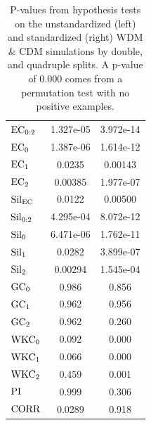 \documentclass[12pt]{article}
\begin{document}
\begin{table}[htp!]
\begin{center}
\begin{tabular}{ l | c |  c }
          $\textup{EC}_{0:2}$ & 1.327e-05 &  3.972e-14 \\
          $\textup{EC}_{0}$ & 1.387e-06 & 1.614e-12 \\
          $\textup{EC}_{1}$ & 0.0235 & 0.00143 \\
          $\textup{EC}_{2}$ & 0.00385 & 1.977e-07 \\
          \midrule
          $\textup{Sil}_{\textup{EC}}$ & 0.0122 & 0.00500 \\ 
          $\textup{Sil}_{0:2}$ & 4.295e-04 & 8.072e-12 \\
          $\textup{Sil}_{0}$ & 6.471e-06 & 1.762e-11 \\
          $\textup{Sil}_{1}$ & 0.0282 & 3.899e-07 \\
          $\textup{Sil}_{2}$ & 0.00294 & 1.545e-04 \\
          \midrule
          $\textup{GC}_{0}$ & 0.986 & 0.856 \\
          $\textup{GC}_{1}$ & 0.962 & 0.956 \\
          $\textup{GC}_{2}$ & 0.962 & 0.260 \\
          \midrule
          $\textup{WKC}_{0}$ & 0.092 & 0.000 \\
          $\textup{WKC}_{1}$ & 0.066 & 0.000 \\
          $\textup{WKC}_{2}$ & 0.459 & 0.001 \\
          $\textup{PI}$ & 0.999 & 0.306 \\
          \midrule
          $\textup{CORR}$ & 0.0289 & 0.918 \\
          \bottomrule
        \end{tabular}
    \end{center}
\caption{P-values from hypothesis tests on the unstandardized (left) and standardized (right) WDM \& CDM simulations by double, and quadruple splits. A p-value of $0.000$ comes from a permutation test with no positive examples.}
\label{table:hypoCDMWDMresults}
\end{table}
\end{document}
